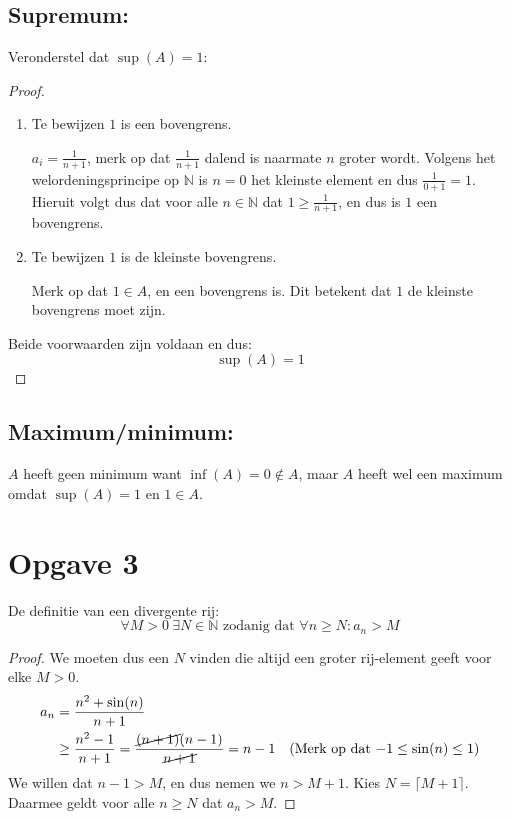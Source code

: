 \documentclass{article}
\newcommand{\N}{\mathbb{N}}
\newcommand{\f}[2]{\frac{#1}{#2}}
\newcommand{\tx}[1]{\text{#1}}
\newcommand{\cn}[1]{\cancel{#1}}
\newcommand{\zdd}{\tx{ zodanig dat }}
\begin{document}
\subsection*{Supremum:}
Veronderstel dat $\sup(A) = 1$:
\begin{proof}
\begin{enumerate}
    \item Te bewijzen $1$ is een bovengrens.

    $a_i = \f{1}{n+1}$, merk op dat $\f{1}{n+1}$ dalend is naarmate $n$ groter wordt.
    Volgens het welordeningsprincipe op $\N$ is $n=0$ het kleinste element en dus $\f{1}{0 + 1} = 1$.
    Hieruit volgt dus dat voor alle $n\in \N $ dat $1 \geq \f{1}{n + 1}$, en dus is $1$ een bovengrens.
    \item Te bewijzen $1$ is de kleinste bovengrens.

    Merk op dat $1 \in A$, en een bovengrens is. Dit betekent dat $1$ de kleinste bovengrens moet zijn. 
\end{enumerate}
Beide voorwaarden zijn voldaan en dus:
    \[\sup(A) = 1\]
\end{proof}
\subsection*{Maximum/minimum:}
$A$ heeft geen minimum want $\inf(A) = 0 \notin A$, maar $A$ heeft wel een maximum omdat $\sup(A) = 1$ en $1 \in A$. 

\section*{Opgave 3}
De definitie van een divergente rij:
\[\forall M > 0 \ \exists N \in \N \zdd \forall n \geq N : a_n > M \]
\begin{proof}
We moeten dus een $N$ vinden die altijd een groter rij-element geeft voor elke $M > 0$.
\begin{align*}
    a_n &= \f{n^2 + \sin(n)}{n + 1} \\
    &\geq \f{n^2 - 1}{n + 1} 
    = \f{\cn{(n+1)}(n-1)}{\cn{n+1}}  
    = n-1 \quad (\tx{Merk op dat $-1 \leq \sin(n) \leq 1$})
\end{align*}
We willen dat $n - 1 > M$, en dus nemen we $n > M + 1$. Kies $N = \lceil M + 1 \rceil$.
Daarmee geldt voor alle $n \geq N$ dat $a_n > M$.  
\end{proof}
\end{document}
